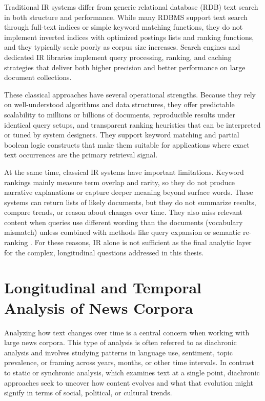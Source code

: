 Traditional IR systems differ from generic relational database (RDB) text search in both structure and performance. While many RDBMS support text search through full-text indices or simple keyword matching functions, they do not implement inverted indices with optimized postings lists and ranking functions, and they typically scale poorly as corpus size increases. Search engines and dedicated IR libraries implement query processing, ranking, and caching strategies that deliver both higher precision and better performance on large document collections.

These classical approaches have several operational strengths. Because they rely on well-understood algorithms and data structures, they offer predictable scalability to millions or billions of documents, reproducible results under identical query setups, and transparent ranking heuristics that can be interpreted or tuned by system designers. They support keyword matching and partial boolean logic constructs that make them suitable for applications where exact text occurrences are the primary retrieval signal.

At the same time, classical IR systems have important limitations. Keyword rankings mainly measure term overlap and rarity, so they do not produce narrative explanations or capture deeper meaning beyond surface words. These systems can return lists of likely documents, but they do not summarize results, compare trends, or reason about changes over time. They also miss relevant content when queries use different wording than the documents (vocabulary mismatch) unless combined with methods like query expansion or semantic re-ranking \cite{ir_retrieval_semantic}. For these reasons, IR alone is not sufficient as the final analytic layer for the complex, longitudinal questions addressed in this thesis.


\section{Longitudinal and Temporal Analysis of News Corpora}

Analyzing how text changes over time is a central concern when working with large news corpora. This type of analysis is often referred to as diachronic analysis and involves studying patterns in language use, sentiment, topic prevalence, or framing across years, months, or other time intervals. In contrast to static or synchronic analysis, which examines text at a single point, diachronic approaches seek to uncover how content evolves and what that evolution might signify in terms of social, political, or cultural trends.

